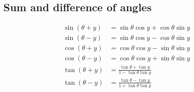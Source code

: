 \subsection*{Sum and difference of angles}

\begin{align*}
  \sin(\theta + y) &= \sin \theta \cos y + \cos \theta \sin y\\
  \sin(\theta - y) &= \sin \theta \cos y - \cos \theta \sin y\\
  \cos(\theta + y) &= \cos \theta \cos y - \sin \theta \sin y\\
  \cos(\theta - y) &= \cos \theta \cos y + \sin \theta \sin y\\
  \tan(\theta + y) &= \frac{\tan \theta + \tan y}{1 - \tan \theta \tan y}\\
  \tan(\theta - y) &= \frac{\tan \theta - \tan y}{1 + \tan \theta \tan y}
\end{align*}